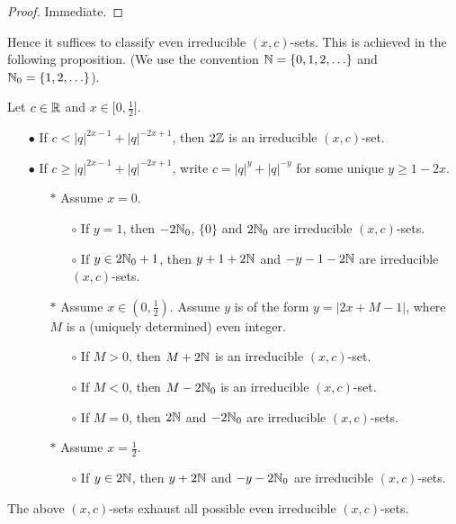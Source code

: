 \begin{proof} Immediate.
\end{proof}

Hence it suffices to classify even irreducible $(x,c)$-sets. This is achieved in the following proposition. (We use the convention $\mathbb{N} = \{0,1,2,\ldots\}$ and $\mathbb{N}_0=\{1,2,\ldots\}$).

\begin{Prop}\label{PropClass1D} Let $c\in \mathbb{R}$ and $x\in \lbrack 0,\frac{1}{2}\rbrack$.  
\begin{itemize}
\item[$\bullet$] If $c< |q|^{2x-1}+|q|^{-2x+1}$, then $2\mathbb{Z}$ is an irreducible $(x,c)$-set.
\item[$\bullet$] If $c\geq |q|^{2x-1}+|q|^{-2x+1}$, write $c=|q|^y+|q|^{-y}$ for some unique $y\geq 1-2x$. 
\begin{itemize}\item[$*$] Assume $x=0$.
\begin{itemize}\item[$\circ$] If $y=1$, then $-2\mathbb{N}_0$, $\{0\}$ and $2\mathbb{N}_0$ are irreducible $(x,c)$-sets.
\item[$\circ$] If $y\in 2\mathbb{N}_0+1$, then $y+1+2\mathbb{N}$ and $-y-1-2\mathbb{N}$ are irreducible $(x,c)$-sets.
\end{itemize}
\item[$*$] Assume $x\in (0,\frac{1}{2})$. Assume $y$ is of the form $y=|2x+M-1|$, where $M$ is a (uniquely determined) even integer. 
\begin{itemize}\item[$\circ$] If $M>0$, then $M+2\mathbb{N}$ is an irreducible $(x,c)$-set. 
\item[$\circ$] If $M<0$, then $M-2\mathbb{N}_0$ is an irreducible $(x,c)$-set. 
\item[$\circ$] If $M=0$, then $2\mathbb{N}$ and $-2\mathbb{N}_0$ are irreducible $(x,c)$-sets.
\end{itemize}
\item[$*$] Assume $x=\frac{1}{2}$.
\begin{itemize}\item[$\circ$] If $y\in 2\mathbb{N}$, then $y+2\mathbb{N}$ and $-y-2\mathbb{N}_0$ are irreducible $(x,c)$-sets.
\end{itemize}
\end{itemize}
\end{itemize}
The above $(x,c)$-sets exhaust all possible even irreducible $(x,c)$-sets.
\end{Prop} 
